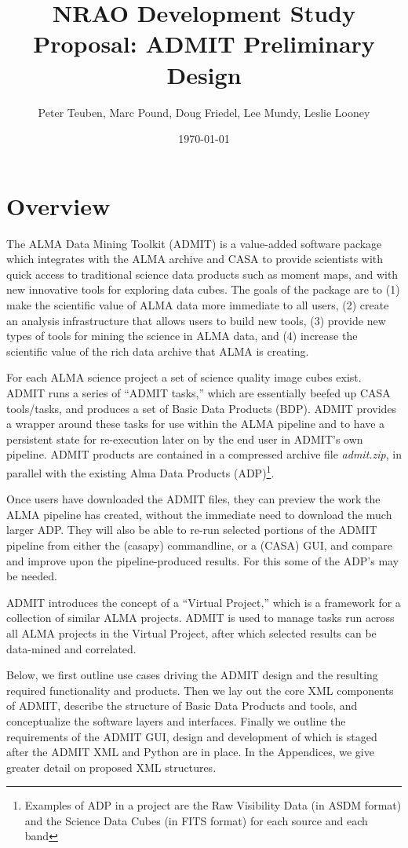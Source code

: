 \documentclass{article}
\title{NRAO Development Study Proposal: ADMIT Preliminary Design}
\author{Peter Teuben, Marc Pound, Doug Friedel, Lee Mundy, Leslie Looney}
\date{\today}
\begin{document}
\maketitle

\section{Overview}

The ALMA Data Mining Toolkit (ADMIT) is a value-added software package
which integrates with the ALMA archive and CASA to provide scientists with
quick access to traditional science data products such as moment maps,
and with new innovative tools for exploring data cubes.  The goals of the
package are to (1) make the scientific value of ALMA data more immediate
to all users, (2) create an analysis infrastructure that allows users to
build new tools, (3) provide new types of tools for mining the science in
ALMA data, and (4) increase the scientific value of the rich data archive
that ALMA is creating.

For each ALMA science project a set of science quality image cubes
exist. ADMIT runs a series of ``ADMIT tasks,'' which are essentially
beefed up CASA tools/tasks, and produces a set of Basic Data Products
(BDP).  ADMIT provides a wrapper around these tasks for use within the
ALMA pipeline and to have a persistent state for re-execution later on by
the end user in ADMIT's own pipeline.  ADMIT products are contained in
a compressed archive file {\it admit.zip}, in parallel with the existing
Alma Data Products (ADP)\footnote{Examples of ADP in a project are the
Raw Visibility Data (in ASDM format) and the Science Data Cubes (in FITS
format) for each source and each band}.

Once users have downloaded the ADMIT files, they can preview the work
the ALMA pipeline has created, without the immediate need to download the
much larger ADP. They will also be able to re-run selected portions
of the ADMIT pipeline from either the (casapy) commandline, or a
(CASA) GUI, and compare and improve upon the pipeline-produced
results. For this some of the ADP's may be needed.

ADMIT introduces the concept of a ``Virtual Project,'' which is a framework
for a collection of similar ALMA projects.  ADMIT is used to manage
tasks run across all ALMA projects in the Virtual Project, after which
selected results can be data-mined and correlated.

Below, we first outline use cases driving the ADMIT design and the
resulting required functionality and products. Then we lay out the core
XML components of ADMIT, describe the structure of Basic Data Products and
tools, and conceptualize the software layers and interfaces.  Finally we
outline the requirements of the ADMIT GUI, design and development of which
is staged after the ADMIT XML and Python are in place.  In the Appendices,
we give greater detail on proposed XML structures.
\end{document}
